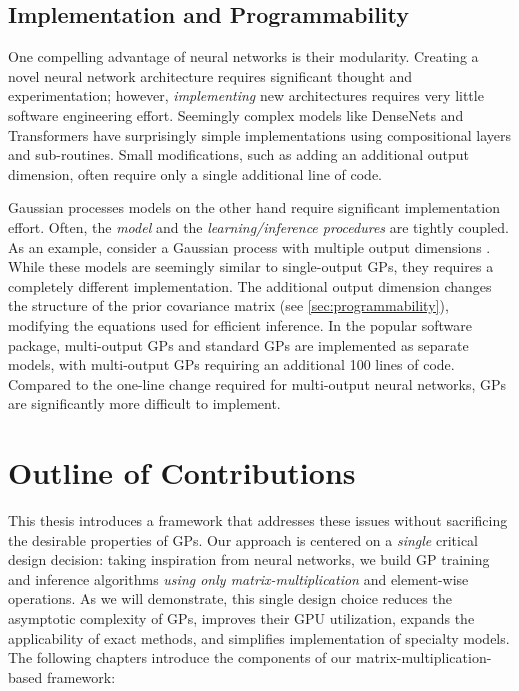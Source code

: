\subsection{Implementation and Programmability}
One compelling advantage of neural networks is their modularity.
Creating a novel neural network architecture requires significant thought and experimentation; however, \emph{implementing} new architectures requires very little software engineering effort.
Seemingly complex models like DenseNets \cite{huang2017densely} and Transformers \cite{vaswani2017attention} have surprisingly simple implementations using compositional layers and sub-routines.
Small modifications, such as adding an additional output dimension, often require only a single additional line of code.

Gaussian processes models on the other hand require significant implementation effort.
Often, the \emph{model} and the \emph{learning/inference procedures} are tightly coupled.
As an example, consider a Gaussian process with multiple output dimensions \cite{bonilla2008multi}.
While these models are seemingly similar to single-output GPs, they requires a completely different implementation.
The additional output dimension changes the structure of the prior covariance matrix (see \cref{sec:programmability}), modifying the equations used for efficient inference.
In the popular \citet{gpy2014} software package, multi-output GPs and standard GPs are implemented as separate models, with multi-output GPs requiring an additional 100 lines of code.
Compared to the one-line change required for multi-output neural networks, GPs are significantly more difficult to implement.



\section{Outline of Contributions}
This thesis introduces a framework that addresses these issues without sacrificing the desirable properties of GPs.
Our approach is centered on a \emph{single} critical design decision:
taking inspiration from neural networks, we build GP training and inference algorithms \emph{using only matrix-multiplication} and element-wise operations.
As we will demonstrate, this single design choice reduces the asymptotic complexity of GPs, improves their GPU utilization, expands the applicability of exact methods, and simplifies implementation of specialty models.
The following chapters introduce the components of our matrix-multiplication-based framework:

